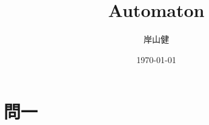 \documentclass[dvipdfmx,11pt,a4paper]{jsarticle}
\title{Automaton}
\author{岸山健}
\date{\today}
\begin{document}
\maketitle
%
\section{問一}

\end{document}
